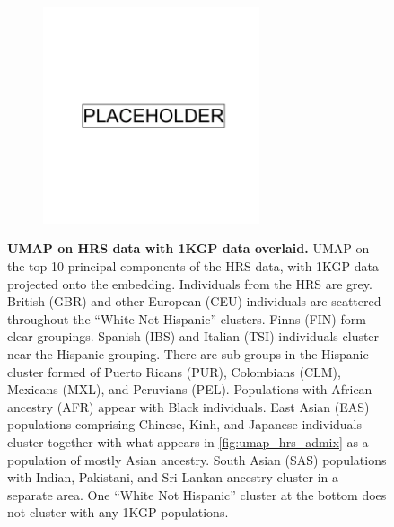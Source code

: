 \begin{figure}
    \centering
    \begin{subfigure}{\textwidth}
    \includegraphics[width=0.7\textwidth]{placeholder.png}
    \end{subfigure}
    \caption[UMAP on HRS data with 1KGP data overlaid]{\textbf{UMAP on HRS data with 1KGP data overlaid.} UMAP on the top 10 principal components of the HRS data, with 1KGP data projected onto the embedding. Individuals from the HRS are grey. British (GBR) and other European (CEU) individuals are scattered throughout the ``White Not Hispanic'' clusters. Finns (FIN) form clear groupings. Spanish (IBS) and Italian (TSI) individuals cluster near the Hispanic grouping. There are sub-groups in the Hispanic cluster formed of Puerto Ricans (PUR), Colombians (CLM), Mexicans (MXL), and Peruvians (PEL). Populations with African ancestry (AFR) appear with Black individuals. East Asian (EAS) populations comprising Chinese, Kinh, and Japanese individuals cluster together with what appears in \ref{fig:umap_hrs_admix} as a population of mostly Asian ancestry. South Asian (SAS) populations with Indian, Pakistani, and Sri Lankan ancestry cluster in a separate area. One ``White Not Hispanic'' cluster at the bottom does not cluster with any 1KGP populations.}
    \label{fig:supp_hrs_1kgp_projected}
\end{figure}

\newpage

